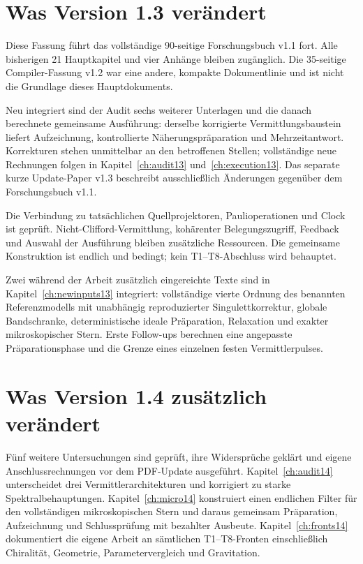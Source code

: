 \documentclass[11pt,a4paper,oneside,parskip=half,headings=normal]{scrreprt}
\begin{document}
\section*{Was Version 1.3 verändert}
Diese Fassung führt das vollständige 90-seitige Forschungsbuch v1.1 fort. Alle bisherigen 21 Hauptkapitel und vier Anhänge bleiben zugänglich. Die 35-seitige Compiler-Fassung v1.2 war eine andere, kompakte Dokumentlinie und ist nicht die Grundlage dieses Hauptdokuments.

Neu integriert sind der Audit sechs weiterer Unterlagen und die danach berechnete gemeinsame Ausführung: derselbe korrigierte Vermittlungsbaustein liefert Aufzeichnung, kontrollierte Näherungspräparation und Mehrzeitantwort. Korrekturen stehen unmittelbar an den betroffenen Stellen; vollständige neue Rechnungen folgen in Kapitel~\ref{ch:audit13} und~\ref{ch:execution13}. Das separate kurze Update-Paper v1.3 beschreibt ausschließlich Änderungen gegenüber dem Forschungsbuch v1.1.

Die Verbindung zu tatsächlichen Quellprojektoren, Paulioperationen und Clock ist geprüft. Nicht-Clifford-Vermittlung, kohärenter Belegungszugriff, Feedback und Auswahl der Ausführung bleiben zusätzliche Ressourcen. Die gemeinsame Konstruktion ist endlich und bedingt; kein T1--T8-Abschluss wird behauptet.

Zwei während der Arbeit zusätzlich eingereichte Texte sind in Kapitel~\ref{ch:newinputs13} integriert: vollständige vierte Ordnung des benannten Referenzmodells mit unabhängig reproduzierter Singulettkorrektur, globale Bandschranke, deterministische ideale Präparation, Relaxation und exakter mikroskopischer Stern. Erste Follow-ups berechnen eine angepasste Präparationsphase und die Grenze eines einzelnen festen Vermittlerpulses.

\section*{Was Version 1.4 zusätzlich verändert}
Fünf weitere Untersuchungen sind geprüft, ihre Widersprüche geklärt und eigene Anschlussrechnungen vor dem PDF-Update ausgeführt. Kapitel~\ref{ch:audit14} unterscheidet drei Vermittlerarchitekturen und korrigiert zu starke Spektralbehauptungen. Kapitel~\ref{ch:micro14} konstruiert einen endlichen Filter für den vollständigen mikroskopischen Stern und daraus gemeinsam Präparation, Aufzeichnung und Schlussprüfung mit bezahlter Ausbeute. Kapitel~\ref{ch:fronts14} dokumentiert die eigene Arbeit an sämtlichen T1--T8-Fronten einschließlich Chiralität, Geometrie, Parametervergleich und Gravitation.
\end{document}
